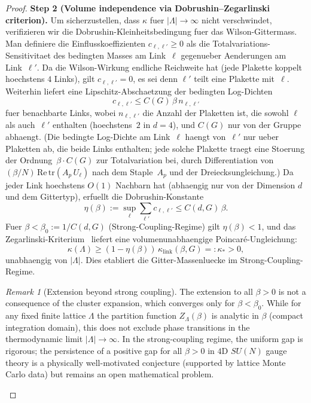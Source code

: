\documentclass[12pt,a4paper]{article}
\theoremstyle{definition}
\theoremstyle{plain}
\theoremstyle{remark}
\newtheorem{remark}[definition]{Remark}
\begin{document}
\begin{proof}
\medskip
\noindent\textbf{Step 2 (Volume independence via Dobrushin--Zegarlinski criterion).}
Um sicherzustellen, dass $\kappa$ fuer $|\Lambda| \to \infty$ nicht verschwindet, verifizieren wir die Dobrushin-Kleinheitsbedingung fuer das Wilson-Gittermass. Man definiere die Einflusskoeffizienten $c_{\ell,\ell'} \geq 0$ als die Totalvariations-Sensitivitaet des bedingten Masses am Link~$\ell$ gegenueber Aenderungen am Link~$\ell'$. Da die Wilson-Wirkung endliche Reichweite hat (jede Plakette koppelt hoechstens $4$ Links), gilt $c_{\ell,\ell'} = 0$, es sei denn $\ell'$ teilt eine Plakette mit~$\ell$. Weiterhin liefert eine Lipschitz-Abschaetzung der bedingten Log-Dichten
\begin{equation}
    c_{\ell,\ell'} \leq C(G)\,\beta\,n_{\ell,\ell'}
\end{equation}
fuer benachbarte Links, wobei $n_{\ell,\ell'}$ die Anzahl der Plaketten ist, die sowohl $\ell$ als auch~$\ell'$ enthalten (hoechstens~$2$ in $d=4$), und $C(G)$ nur von der Gruppe abhaengt. (Die bedingte Log-Dichte am Link~$\ell$ haengt von~$\ell'$ nur ueber Plaketten ab, die beide Links enthalten; jede solche Plakette traegt eine Stoerung der Ordnung~$\beta\cdot C(G)$ zur Totalvariation bei, durch Differentiation von $(\beta/N)\,\mathrm{Re}\,\mathrm{tr}(A_p\,U_\ell)$ nach dem Staple~$A_p$ und der Dreiecksungleichung.) Da jeder Link hoechstens $O(1)$ Nachbarn hat (abhaengig nur von der Dimension $d$ und dem Gittertyp), erfuellt die Dobrushin-Konstante
\begin{equation}
    \eta(\beta) := \sup_\ell \sum_{\ell'} c_{\ell,\ell'} \leq C(d,G)\,\beta.
\end{equation}
Fuer $\beta < \beta_0 := 1/C(d,G)$ (Strong-Coupling-Regime) gilt $\eta(\beta) < 1$, und das Zegarlinski-Kriterium~\cite{Zegarlinski1992} liefert eine volumenunabhaengige Poincar\'e-Ungleichung:
\begin{equation}
    \kappa(\Lambda) \geq (1 - \eta(\beta))\,\kappa_{\mathrm{link}}(\beta, G) =: \kappa_* > 0,
\end{equation}
unabhaengig von $|\Lambda|$. Dies etabliert die Gitter-Massenluecke im Strong-Coupling-Regime.

\begin{remark}[Extension beyond strong coupling]\label{rem:all-beta}
The extension to all $\beta > 0$ is not a consequence of the cluster expansion, which converges only for $\beta < \beta_0$. While for any fixed finite lattice $\Lambda$ the partition function $Z_\Lambda(\beta)$ is analytic in $\beta$ (compact integration domain), this does not exclude phase transitions in the thermodynamic limit $|\Lambda| \to \infty$. In the strong-coupling regime, the uniform gap is rigorous; the persistence of a positive gap for all $\beta > 0$ in $4$D $SU(N)$ gauge theory is a physically well-motivated conjecture (supported by lattice Monte Carlo data) but remains an open mathematical problem.
\end{remark}


\end{proof}
\end{document}

